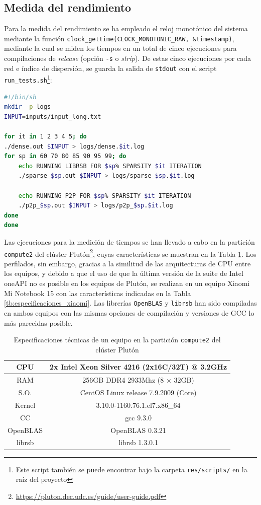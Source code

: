 \subsection{Medida del rendimiento}
\label{ssec:medida_rendimiento_metodologia}
Para la medida del rendimiento se ha empleado el reloj monotónico del sistema mediante la función \texttt{clock\_gettime(CLOCK\_MONOTONIC\_RAW, \&timestamp)}, mediante la cual se miden los tiempos en un total de cinco ejecuciones para compilaciones de \textit{release} (opción \texttt{-s} o \textit{strip}). De estas cinco ejecuciones por cada red e índice de dispersión, se guarda la salida de \texttt{stdout} con el script \texttt{run\_tests.sh}\footnote{Este script también se puede encontrar bajo la carpeta \texttt{res/scripts/} en la raíz del proyecto}:\medskip
\begin{lstlisting}[language=bash]
#!/bin/sh
mkdir -p logs
INPUT=inputs/input_long.txt

for it in 1 2 3 4 5; do
./dense.out $INPUT > logs/dense.$it.log
for sp in 60 70 80 85 90 95 99; do
    echo RUNNING LIBRSB FOR $sp% SPARSITY $it ITERATION
    ./sparse_$sp.out $INPUT > logs/sparse_$sp.$it.log

    echo RUNNING P2P FOR $sp% SPARSITY $it ITERATION
    ./p2p_$sp.out $INPUT > logs/p2p_$sp.$it.log
done
done  
\end{lstlisting}

Las ejecuciones para la medición de tiempos se han llevado a cabo en la partición \texttt{compute2} del clúster Plutón\footnote{\url{https://pluton.dec.udc.es/guide/user-guide.pdf}}, cuyas características se muestran en la Tabla \ref{tb:especificaciones_compute2}. Los perfilados, sin embargo, gracias a la similitud de las arquitecturas de CPU entre los equipos, y debido a que el uso de que la última versión de la suite de Intel oneAPI no es posible en los equipos de Plutón, se realizan en un equipo Xiaomi Mi Notebook 15 con las características indicadas en la Tabla \ref{tb:especificaciones_xiaomi}. Las librerías \texttt{OpenBLAS} y \texttt{librsb} han sido compiladas en ambos equipos con las mismas opciones de compilación y versiones de GCC lo más parecidas posible.
\begin{table}[htpb]
\centering
\begin{tabular}{|c|c|}
    \hline
    CPU & 2x Intel Xeon Silver 4216 (2x16C/32T) @ 3.2GHz\\\hline
    RAM & 256GB DDR4 2933Mhz (8 $\times$ 32GB)\\\hline
    S.O. & CentOS Linux release 7.9.2009 (Core) \\\hline
    Kernel & 3.10.0-1160.76.1.el7.x86\_64 \\\hline
    CC & gcc 9.3.0\\\hline
    OpenBLAS & OpenBLAS 0.3.21\\\hline
    librsb & librsb 1.3.0.1\\\hline
\end{tabular}
\caption{\label{tb:especificaciones_compute2}Especificaciones técnicas de un equipo en la partición \texttt{compute2} del clúster Plutón}
\end{table}

